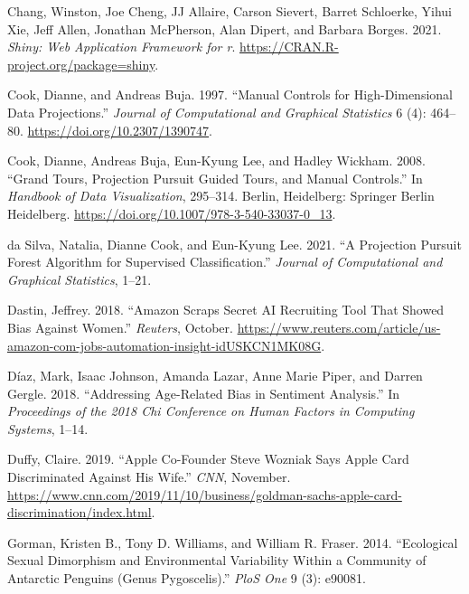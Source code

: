 \documentclass[
]{article}
\newlength{\cslhangindent}
\newlength{\cslentryspacingunit} %
\newenvironment{CSLReferences}[2] %
 {%
  \setlength{\parindent}{0pt}
  \ifodd #1
  \let\oldpar\par
  \def\par{\hangindent=\cslhangindent\oldpar}
  \fi
  \setlength{\parskip}{#2\cslentryspacingunit}
 }%
 {}
\begin{document}
\begin{CSLReferences}{1}{0}
\leavevmode{}%
Chang, Winston, Joe Cheng, JJ Allaire, Carson Sievert, Barret Schloerke, Yihui Xie, Jeff Allen, Jonathan McPherson, Alan Dipert, and Barbara Borges. 2021. \emph{Shiny: Web Application Framework for r}. \url{https://CRAN.R-project.org/package=shiny}.

\leavevmode{}%
Cook, Dianne, and Andreas Buja. 1997. {``Manual {Controls} for {High}-{Dimensional} {Data} {Projections}.''} \emph{Journal of Computational and Graphical Statistics} 6 (4): 464--80. \url{https://doi.org/10.2307/1390747}.

\leavevmode{}%
Cook, Dianne, Andreas Buja, Eun-Kyung Lee, and Hadley Wickham. 2008. {``Grand {Tours}, {Projection} {Pursuit} {Guided} {Tours}, and {Manual} {Controls}.''} In \emph{Handbook of {Data} {Visualization}}, 295--314. Berlin, Heidelberg: Springer Berlin Heidelberg. \url{https://doi.org/10.1007/978-3-540-33037-0_13}.

\leavevmode{}%
da Silva, Natalia, Dianne Cook, and Eun-Kyung Lee. 2021. {``A {Projection} {Pursuit} {Forest} {Algorithm} for {Supervised} {Classification}.''} \emph{Journal of Computational and Graphical Statistics}, 1--21.

\leavevmode{}%
Dastin, Jeffrey. 2018. {``Amazon Scraps Secret {AI} Recruiting Tool That Showed Bias Against Women.''} \emph{Reuters}, October. \url{https://www.reuters.com/article/us-amazon-com-jobs-automation-insight-idUSKCN1MK08G}.

\leavevmode{}%
Díaz, Mark, Isaac Johnson, Amanda Lazar, Anne Marie Piper, and Darren Gergle. 2018. {``Addressing Age-Related Bias in Sentiment Analysis.''} In \emph{Proceedings of the 2018 Chi Conference on Human Factors in Computing Systems}, 1--14.

\leavevmode{}%
Duffy, Claire. 2019. {``Apple Co-Founder {Steve} {Wozniak} Says {Apple} {Card} Discriminated Against His Wife.''} \emph{CNN}, November. \url{https://www.cnn.com/2019/11/10/business/goldman-sachs-apple-card-discrimination/index.html}.

\leavevmode{}%
Gorman, Kristen B., Tony D. Williams, and William R. Fraser. 2014. {``Ecological Sexual Dimorphism and Environmental Variability Within a Community of {Antarctic} Penguins (Genus {Pygoscelis}).''} \emph{PloS One} 9 (3): e90081.


\end{CSLReferences}
\end{document}
